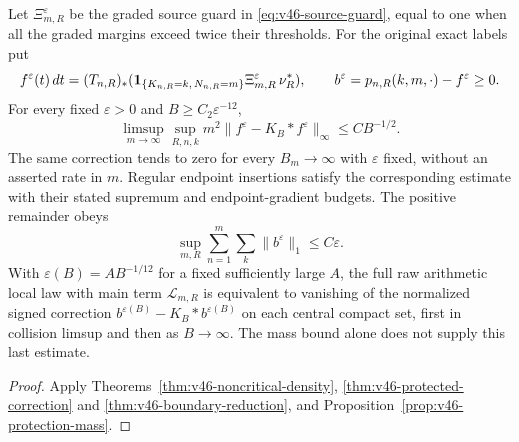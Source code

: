 \begin{leadtheorem}
\label{thm:intro-v46-protected-inverse}
Let $\Xi_{m,R}^{\varepsilon}$ be the graded source guard in
\eqref{eq:v46-source-guard}, equal to one when all the graded margins
exceed twice their thresholds. For the original exact labels put
\[
 f^\varepsilon(t)\,dt
  =(T_{n,R})_*(\mathbf1_{\{K_{n,R}=k,\,N_{n,R}=m\}}
                   \Xi_{m,R}^{\varepsilon}\,\nu_R^*),\qquad
 b^\varepsilon=p_{n,R}(k,m,\cdot)-f^\varepsilon\ge0.
\]
For every fixed $\varepsilon>0$ and $B\ge C_2\varepsilon^{-12}$,
\begin{equation}\label{eq:intro-v46-band-modulus}
 \limsup_{m\to\infty}\sup_{R,n,k}
     m^2\|f^\varepsilon-K_B*f^\varepsilon\|_\infty
                                 \le C B^{-1/2}.
\end{equation}
The same correction tends to zero for every $B_m\to\infty$ with
$\varepsilon$ fixed, without an asserted rate in $m$. Regular endpoint
insertions satisfy the corresponding estimate with their stated
supremum and endpoint-gradient budgets. The positive remainder obeys
\[
 \sup_{m,R}\sum_{n=1}^m\sum_k\|b^\varepsilon\|_1
                                    \le C\varepsilon.
\]
With $\varepsilon(B)=AB^{-1/12}$ for a fixed sufficiently large $A$,
the full raw arithmetic local law with main term $\mathcal L_{m,R}$
is equivalent to vanishing of the normalized signed correction
$b^{\varepsilon(B)}-K_B*b^{\varepsilon(B)}$ on each central compact
set, first in collision limsup and then as $B\to\infty$.
The mass bound alone does not supply this last estimate.
\end{leadtheorem}
\begin{proof}
Apply Theorems~\ref{thm:v46-noncritical-density},
\ref{thm:v46-protected-correction} and
\ref{thm:v46-boundary-reduction}, and
Proposition~\ref{prop:v46-protection-mass}.
\end{proof}


